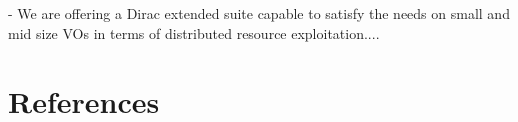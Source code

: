 \documentclass[a4paper]{jpconf}
\begin{document}
- We are offering a Dirac extended suite capable to satisfy the
needs on small and mid size VOs in terms of distributed
resource exploitation....



\section*{References}

\begin{thebibliography}{30}










\end{thebibliography}
\end{document}
